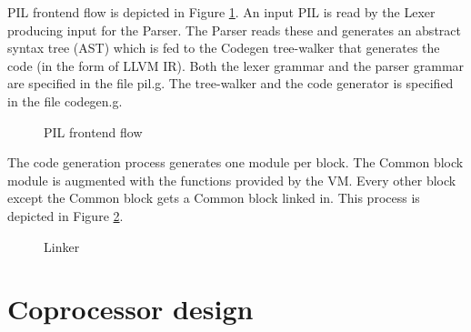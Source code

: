 PIL frontend flow is depicted in Figure \ref{fig:parser_flow}.  An
input PIL is read by the Lexer producing input for the Parser. The
Parser reads these and generates an abstract syntax tree (AST) which
is fed to the Codegen tree-walker that generates the code (in the form
of LLVM IR). Both the lexer grammar and the parser grammar are
specified in the file pil.g. The tree-walker and the code generator is
specified in the file codegen.g.

\begin{figure}[hbt!]
  \centering
  \caption{PIL frontend flow}
  \label{fig:parser_flow}
\end{figure}

\filbreak

The code generation process generates one module per block. The Common
block module is augmented with the functions provided by the VM.
Every other block except the Common block gets a Common block linked
in. This process is depicted in Figure \ref{fig:linker}.

\begin{figure}[hbt!]
  \centering
  \caption{Linker}
  \label{fig:linker}
\end{figure}

\section{Coprocessor design}

